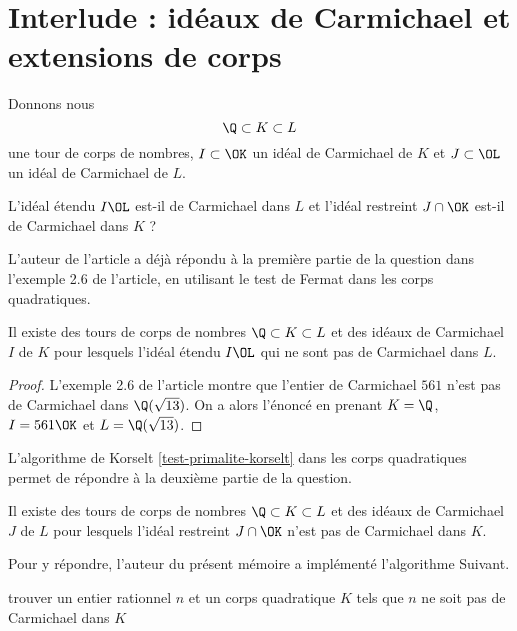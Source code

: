 \section{Interlude : idéaux de Carmichael et extensions de corps}

Donnons nous \[\Q\subset K \subset L\] une tour de corps de nombres, $I\subset \OK$ un idéal de Carmichael de $K$ et $J \subset \OL$ un idéal de Carmichael de $L$. 

\begin{question}
	L'idéal étendu $I\OL$ est-il de Carmichael dans $L$ et l'idéal restreint $J\cap\OK$ est-il de Carmichael dans $K$ ? 
\end{question}

L'auteur de l'article a déjà répondu à la première partie de la question dans l'exemple 2.6 de l'article, en utilisant le test de Fermat dans les corps quadratiques.

\begin{proposition}\label{premier-ce}
	Il existe des tours de corps de nombres $\Q\subset K \subset L$ et des idéaux de Carmichael $I$ de $K$ pour lesquels l'idéal étendu $I\OL$ qui ne sont pas de Carmichael dans $L$.
\end{proposition}

\begin{proof}
	L'exemple 2.6 de l'article montre que l'entier de Carmichael $561$ n'est pas de Carmichael dans $\Q(\sqrt{13})$. On a alors l'énoncé en prenant $K = \Q$, $I = 561\OK$ et $L = \Q(\sqrt{13})$.
\end{proof}

L'algorithme de Korselt \ref{test-primalite-korselt} dans les corps quadratiques permet de répondre à la deuxième partie de la question. 

\begin{proposition}\label{deuxieme-ce}
	Il existe des tours de corps de nombres $\Q\subset K \subset L$ et des idéaux de Carmichael $J$ de $L$ pour lesquels l'idéal restreint $J\cap \OK$ n'est pas de Carmichael dans $K$.
\end{proposition}

Pour y répondre, l'auteur du présent mémoire a implémenté l'algorithme Suivant.

\vspace{1em}
\begin{algorithm}[H]\label{test-Fermat-quadratique}
\caption{trouver un entier rationnel $n$ et un corps quadratique $K$ tels que $n$ ne soit pas de Carmichael dans $K$}
\end{algorithm}
\vspace{1em}

